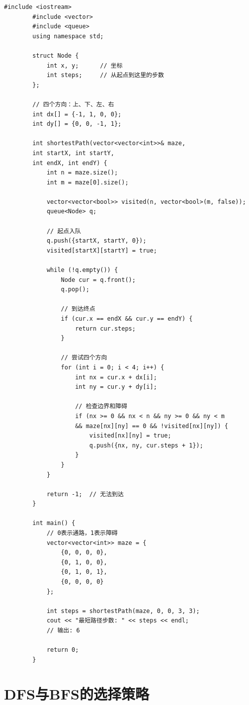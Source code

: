 \documentclass[12pt,a4paper]{article}
\begin{document}
	\begin{lstlisting}[caption={BFS - 迷宫最短路径}]
		#include <iostream>
		#include <vector>
		#include <queue>
		using namespace std;
		
		struct Node {
			int x, y;      // 坐标
			int steps;     // 从起点到这里的步数
		};
		
		// 四个方向：上、下、左、右
		int dx[] = {-1, 1, 0, 0};
		int dy[] = {0, 0, -1, 1};
		
		int shortestPath(vector<vector<int>>& maze, 
		int startX, int startY, 
		int endX, int endY) {
			int n = maze.size();
			int m = maze[0].size();
			
			vector<vector<bool>> visited(n, vector<bool>(m, false));
			queue<Node> q;
			
			// 起点入队
			q.push({startX, startY, 0});
			visited[startX][startY] = true;
			
			while (!q.empty()) {
				Node cur = q.front();
				q.pop();
				
				// 到达终点
				if (cur.x == endX && cur.y == endY) {
					return cur.steps;
				}
				
				// 尝试四个方向
				for (int i = 0; i < 4; i++) {
					int nx = cur.x + dx[i];
					int ny = cur.y + dy[i];
					
					// 检查边界和障碍
					if (nx >= 0 && nx < n && ny >= 0 && ny < m 
					&& maze[nx][ny] == 0 && !visited[nx][ny]) {
						visited[nx][ny] = true;
						q.push({nx, ny, cur.steps + 1});
					}
				}
			}
			
			return -1;  // 无法到达
		}
		
		int main() {
			// 0表示通路，1表示障碍
			vector<vector<int>> maze = {
				{0, 0, 0, 0},
				{0, 1, 0, 0},
				{0, 1, 0, 1},
				{0, 0, 0, 0}
			};
			
			int steps = shortestPath(maze, 0, 0, 3, 3);
			cout << "最短路径步数: " << steps << endl;
			// 输出: 6
			
			return 0;
		}
	\end{lstlisting}
	
	\section{DFS与BFS的选择策略}
	
\end{document}
